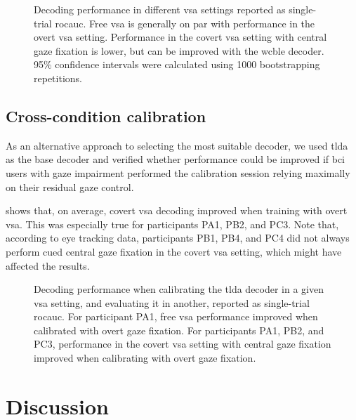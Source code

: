 \begin{figure}
  
  \caption[%
    Decoding performance in different \acs{vsa} settings.
  ]{%
    Decoding performance in different \ac{vsa} settings reported as
    single-trial \ac{rocauc}.
    Free \ac{vsa} is generally on par with performance in the overt \ac{vsa}
    setting.
    Performance in the covert \ac{vsa} setting with central gaze fixation is lower, but can
    be improved with the \ac{wcble} decoder.
    95\% confidence intervals were calculated using 1000 bootstrapping
    repetitions.
  }
  \label{fig:patients/decode}
\end{figure}

\subsection{Cross-condition calibration}
\label{sec:patients/outcomes/cross}

As an alternative approach to selecting the most suitable decoder, we used
\ac{tlda} as the base decoder and verified whether performance could be improved
if \ac{bci} users with gaze impairment performed the calibration session relying
maximally on their residual gaze control.

 shows that, on average, covert \ac{vsa} decoding
improved when training with overt \ac{vsa}.
This was especially true for participants PA1, PB2, and PC3.
Note that, according to eye tracking data, participants PB1, PB4, and PC4 did not
always perform cued central gaze fixation in the covert \ac{vsa} setting,
which might have affected the results.

\begin{figure}
  
  \caption[Cross-setting calibration and decoding performance.]{
    Decoding performance when calibrating the \ac{tlda} decoder in a given \ac{vsa}
    setting, and evaluating it in another, reported as
    single-trial \ac{rocauc}.
    For participant PA1, free \ac{vsa} performance improved when
    calibrated with overt gaze fixation.
    For participants PA1, PB2, and PC3, performance in the covert \ac{vsa} setting with central gaze fixation
    improved when calibrating with overt gaze fixation.
  }
  \label{fig:patients/cross}
\end{figure}

\section{Discussion}

